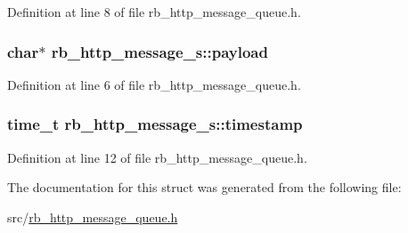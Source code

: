 Definition at line 8 of file rb\+\_\+http\+\_\+message\+\_\+queue.\+h.

\hypertarget{structrb__http__message__s_a70cd28f794d09eb47cf19a37fb7ba42b}{}
\subsubsection[{payload}]{\setlength{\rightskip}{0pt plus 5cm}char$\ast$ rb\+\_\+http\+\_\+message\+\_\+s\+::payload}\label{structrb__http__message__s_a70cd28f794d09eb47cf19a37fb7ba42b}


Definition at line 6 of file rb\+\_\+http\+\_\+message\+\_\+queue.\+h.

\hypertarget{structrb__http__message__s_ac11579bf2388ba0b7baea1c50a94d347}{}
\subsubsection[{timestamp}]{\setlength{\rightskip}{0pt plus 5cm}time\+\_\+t rb\+\_\+http\+\_\+message\+\_\+s\+::timestamp}\label{structrb__http__message__s_ac11579bf2388ba0b7baea1c50a94d347}


Definition at line 12 of file rb\+\_\+http\+\_\+message\+\_\+queue.\+h.



The documentation for this struct was generated from the following file\+:\begin{DoxyCompactItemize}
\item 
src/\hyperlink{rb__http__message__queue_8h}{rb\+\_\+http\+\_\+message\+\_\+queue.\+h}\end{DoxyCompactItemize}
